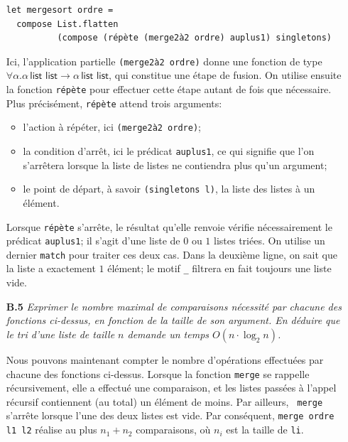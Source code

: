 \documentclass[11pt, a4paper]{article}
\begin{document}
\begin{itemize}
{\begin{verbatim}
let mergesort ordre =
  compose List.flatten
          (compose (répète (merge2à2 ordre) auplus1) singletons)
      \end{verbatim}
}

      \smallskip

      Ici, l'application partielle \verb+(merge2à2 ordre)+ donne une
      fonction de type $\forall\alpha.\alpha \, \textsf{list list}
      \rightarrow \alpha \, \textsf{list list}$, qui constitue une
      étape de fusion.  On utilise ensuite la fonction {\tt répète}
      pour effectuer cette étape autant de fois que nécessaire. Plus
      précisément, {\tt répète} attend trois arguments:

      \begin{itemize}

        \item l'action à répéter, ici \verb+(merge2à2 ordre)+;

        \item la condition d'arrêt, ici le prédicat {\tt auplus1}, ce
              qui signifie que l'on s'arrêtera lorsque la liste de
              listes ne contiendra plus qu'un argument;

        \item le point de départ, à savoir \verb+(singletons l)+, la
              liste des listes à un élément.

      \end{itemize}

      Lorsque {\tt répète} s'arrête, le résultat qu'elle renvoie
      vérifie nécessairement le prédicat {\tt auplus1}; il s'agit
      d'une liste de $0$ ou $1$ listes triées. On utilise un dernier
      {\tt match} pour traiter ces deux cas.  Dans la deuxième ligne,
      on sait que la liste a exactement $1$ élément; le motif \verb+_+
      filtrera en fait toujours une liste vide.

     \smallskip

  \item[\textbf{B.5}] \emph{Exprimer le nombre maximal de comparaisons
      nécessité par chacune des fonctions ci-dessus, en fonction de la
      taille de son argument. En déduire que le tri d'une liste de
      taille $n$ demande un temps $O(n \cdot \log_2 n)$.}

      \smallskip

      Nous pouvons maintenant compter le nombre d'opérations
      effectuées par chacune des fonctions ci-dessus. Lorsque la
      fonction {\tt merge} se rappelle récursivement, elle a effectué
      une comparaison, et les listes passées à l'appel récursif
      contiennent (au total) un élément de moins. Par ailleurs, {\tt
      merge} s'arrête lorsque l'une des deux listes est vide. Par
      conséquent, \texttt{merge ordre l1 l2} réalise au plus $n_1+n_2$
      comparaisons, où $n_i$ est la taille de {\tt li}.


\end{itemize}
\end{document}
